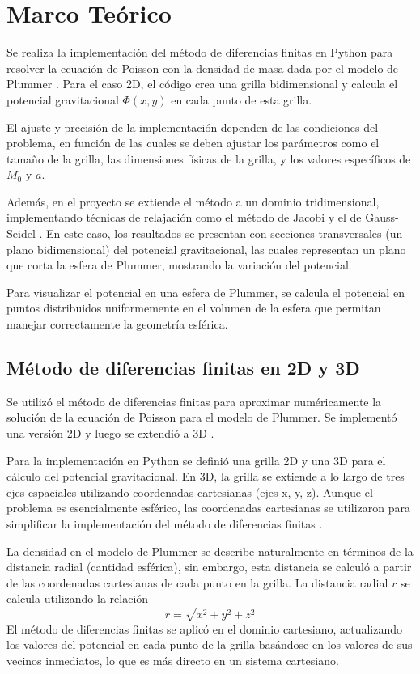 \documentclass[reprint,amsmath,amssymb,aps]{revtex4-1}
\begin{document}
\section{Marco Teórico}
Se realiza la implementación del método de diferencias finitas en Python para resolver la ecuación de Poisson con la densidad de masa dada por el modelo de Plummer \cite{laplacian}. Para el caso 2D, el código crea una grilla bidimensional y calcula el potencial gravitacional $\Phi(x,y)$ en cada punto de esta grilla.

El ajuste y precisión de la implementación dependen de las condiciones del problema, en función de las cuales se deben ajustar los parámetros como el tamaño de la grilla, las dimensiones físicas de la grilla, y los valores específicos de $M_0$ y $a$.

Además, en el proyecto se extiende el método a un dominio tridimensional, implementando técnicas de relajación como el método de Jacobi \cite{jacobi} y el de Gauss-Seidel \cite{poissonGauss}. En este caso, los resultados se presentan con secciones transversales (un plano bidimensional) del potencial gravitacional, las cuales representan un plano que corta la esfera de Plummer, mostrando la variación del potencial.

Para visualizar el potencial en una esfera de Plummer, se calcula el potencial en puntos distribuidos uniformemente en el volumen de la esfera que permitan manejar correctamente la geometría esférica.

\subsection{Método de diferencias finitas en 2D y 3D}
Se utilizó el método de diferencias finitas para aproximar numéricamente la solución de la ecuación de Poisson para el modelo de Plummer. Se implementó una versión 2D y luego se extendió a 3D \cite{fdm}.

Para la implementación en Python se definió una grilla 2D y una 3D para el cálculo del potencial gravitacional. En 3D, la grilla se extiende a lo largo de tres ejes espaciales utilizando coordenadas cartesianas (ejes x, y, z). Aunque el problema es esencialmente esférico, las coordenadas cartesianas se utilizaron para simplificar la implementación del método de diferencias finitas \cite{laplacian}.

La densidad en el modelo de Plummer se describe naturalmente en términos de la distancia radial (cantidad esférica), sin embargo, esta distancia se calculó a partir de las coordenadas cartesianas de cada punto en la grilla. La distancia radial $r$ se calcula utilizando la relación
\begin{equation}
    r = \sqrt{x^2 + y^2 + z^2}
\end{equation}
El método de diferencias finitas se aplicó en el dominio cartesiano, actualizando los valores del potencial en cada punto de la grilla basándose en los valores de sus vecinos inmediatos, lo que es más directo en un sistema cartesiano.
\end{document}
